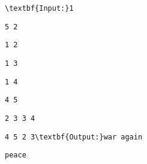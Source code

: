 \begin{verbatim}
\textbf{Input:}1\end{verbatim}
\begin{verbatim}
5 2\end{verbatim}
\begin{verbatim}
1 2\end{verbatim}
\begin{verbatim}
1 3\end{verbatim}
\begin{verbatim}
1 4\end{verbatim}
\begin{verbatim}
4 5\end{verbatim}
\begin{verbatim}
2 3 3 4\end{verbatim}
\begin{verbatim}
4 5 2 3\textbf{Output:}war again\end{verbatim}
\begin{verbatim}
peace\end{verbatim}